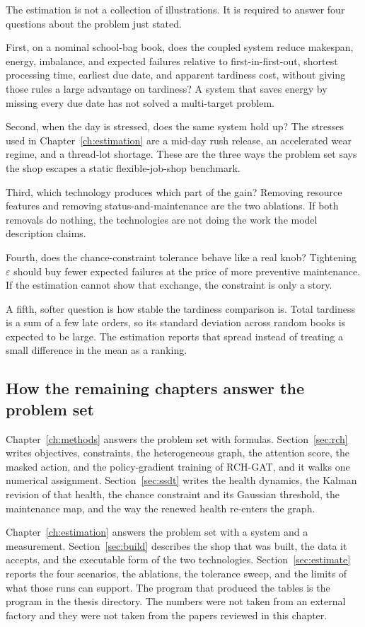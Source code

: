 The estimation is not a collection of illustrations. It is required to answer four questions about the problem just stated.

First, on a nominal school-bag book, does the coupled system reduce makespan, energy, imbalance, and expected failures relative to first-in-first-out, shortest processing time, earliest due date, and apparent tardiness cost, without giving those rules a large advantage on tardiness? A system that saves energy by missing every due date has not solved a multi-target problem.

Second, when the day is stressed, does the same system hold up? The stresses used in Chapter~\ref{ch:estimation} are a mid-day rush release, an accelerated wear regime, and a thread-lot shortage. These are the three ways the problem set says the shop escapes a static flexible-job-shop benchmark.

Third, which technology produces which part of the gain? Removing resource features and removing status-and-maintenance are the two ablations. If both removals do nothing, the technologies are not doing the work the model description claims.

Fourth, does the chance-constraint tolerance behave like a real knob? Tightening \(\varepsilon\) should buy fewer expected failures at the price of more preventive maintenance. If the estimation cannot show that exchange, the constraint is only a story.

A fifth, softer question is how stable the tardiness comparison is. Total tardiness is a sum of a few late orders, so its standard deviation across random books is expected to be large. The estimation reports that spread instead of treating a small difference in the mean as a ranking.

\subsection{How the remaining chapters answer the problem set}

Chapter~\ref{ch:methods} answers the problem set with formulas. Section~\ref{sec:rch} writes objectives, constraints, the heterogeneous graph, the attention score, the masked action, and the policy-gradient training of RCH-GAT, and it walks one numerical assignment. Section~\ref{sec:ssdt} writes the health dynamics, the Kalman revision of that health, the chance constraint and its Gaussian threshold, the maintenance map, and the way the renewed health re-enters the graph.

Chapter~\ref{ch:estimation} answers the problem set with a system and a measurement. Section~\ref{sec:build} describes the shop that was built, the data it accepts, and the executable form of the two technologies. Section~\ref{sec:estimate} reports the four scenarios, the ablations, the tolerance sweep, and the limits of what those runs can support. The program that produced the tables is the program in the thesis directory. The numbers were not taken from an external factory and they were not taken from the papers reviewed in this chapter.
